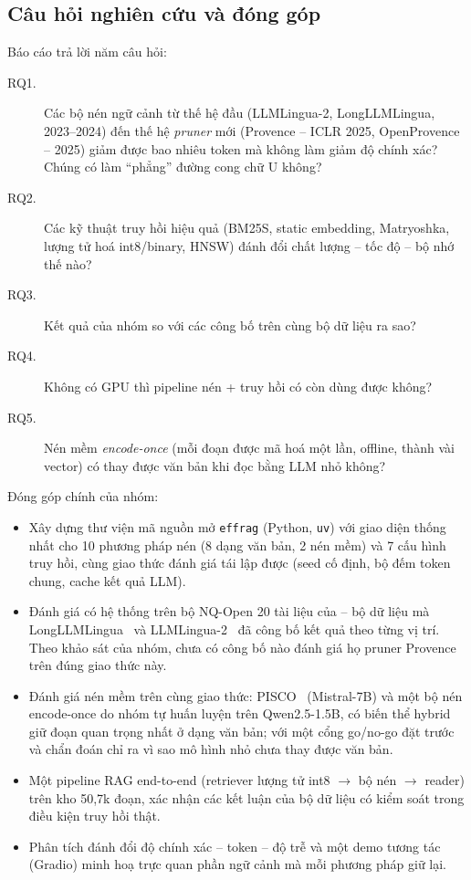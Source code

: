 \subsection{Câu hỏi nghiên cứu và đóng góp}

Báo cáo trả lời năm câu hỏi:
\begin{description}
  \item[RQ1.] Các bộ nén ngữ cảnh từ thế hệ đầu (LLMLingua-2, LongLLMLingua, 2023--2024) đến thế hệ
  \emph{pruner} mới (Provence -- ICLR 2025, OpenProvence -- 2025) giảm được bao nhiêu token mà không
  làm giảm độ chính xác? Chúng có làm ``phẳng'' đường cong chữ U không?
  \item[RQ2.] Các kỹ thuật truy hồi hiệu quả (BM25S, static embedding, Matryoshka, lượng tử hoá
  int8/binary, HNSW) đánh đổi chất lượng -- tốc độ -- bộ nhớ thế nào?
  \item[RQ3.] Kết quả của nhóm so với các công bố trên cùng bộ dữ liệu ra sao?
  \item[RQ4.] Không có GPU thì pipeline nén + truy hồi có còn dùng được không?
  \item[RQ5.] Nén mềm \emph{encode-once} (mỗi đoạn được mã hoá một lần, offline, thành vài vector) có thay
  được văn bản khi đọc bằng LLM nhỏ không?
\end{description}

Đóng góp chính của nhóm:
\begin{itemize}
  \item Xây dựng thư viện mã nguồn mở \texttt{effrag} (Python, \texttt{uv}) với giao diện thống nhất
  cho 10 phương pháp nén (8 dạng văn bản, 2 nén mềm) và 7 cấu hình truy hồi, cùng giao thức đánh giá tái lập được (seed cố định,
  bộ đếm token chung, cache kết quả LLM).
  \item Đánh giá có hệ thống trên bộ NQ-Open 20 tài liệu của \citet{liu2024lost} -- bộ dữ liệu mà
  LongLLMLingua~\cite{jiang2024longllmlingua} và LLMLingua-2~\cite{pan2024llmlingua2} đã công bố kết
  quả theo từng vị trí. Theo khảo sát của nhóm, chưa có công bố nào đánh giá họ pruner Provence trên
  đúng giao thức này.
  \item Đánh giá nén mềm trên cùng giao thức: PISCO~\cite{louis2025pisco} (Mistral-7B) và một bộ nén
  encode-once do nhóm tự huấn luyện trên Qwen2.5-1.5B, có biến thể hybrid giữ đoạn quan trọng nhất ở dạng
  văn bản; với một cổng go/no-go đặt trước và chẩn đoán chỉ ra vì sao mô hình nhỏ chưa thay được văn bản.
  \item Một pipeline RAG end-to-end (retriever lượng tử int8 $\to$ bộ nén $\to$ reader) trên kho
  50,7k đoạn, xác nhận các kết luận của bộ dữ liệu có kiểm soát trong điều kiện truy hồi thật.
  \item Phân tích đánh đổi độ chính xác -- token -- độ trễ và một demo tương tác (Gradio) minh hoạ
  trực quan phần ngữ cảnh mà mỗi phương pháp giữ lại.
\end{itemize}

